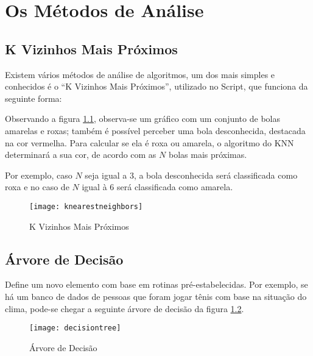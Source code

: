 \chapter{Os Métodos de Análise}
\label{chapter:os_metodos_de_analise}

\section{\textbf{K Vizinhos Mais Próximos}}

Existem vários métodos de análise de algoritmos, um dos mais simples e conhecidos é o ``K Vizinhos Mais Próximos'',
utilizado no Script, que funciona da seguinte forma:

Observando a figura \ref{fig:knearestneighbors}, observa-se um gráfico com um conjunto de bolas amarelas e roxas;
também é possível perceber uma bola desconhecida, destacada na cor vermelha.
Para calcular se ela é roxa ou amarela, o algoritmo do KNN determinará a sua cor, de acordo com as $N$ bolas mais próximas.

Por exemplo, caso $N$ seja igual a $3$,
a bola desconhecida será classificada como roxa e no caso de $N$ igual à $6$ será classificada como amarela.

\begin{figure}[!htb]
\begin{center}
\caption{K Vizinhos Mais Próximos}
\texttt{[image: knearestneighbors]}
\label{fig:knearestneighbors}
\end{center}
\end{figure}

\section{\textbf{Árvore de Decisão}}

Define um novo elemento com base em rotinas pré-estabelecidas.
Por exemplo, se há um banco de dados de pessoas que foram jogar tênis com base na situação do clima,
pode-se chegar a seguinte árvore de decisão da figura \ref{fig:decisiontree}.


\begin{figure}[!htb]
\begin{center}
\caption{Árvore de Decisão}
\texttt{[image: decisiontree]}
\label{fig:decisiontree}
\end{center}
\end{figure}

